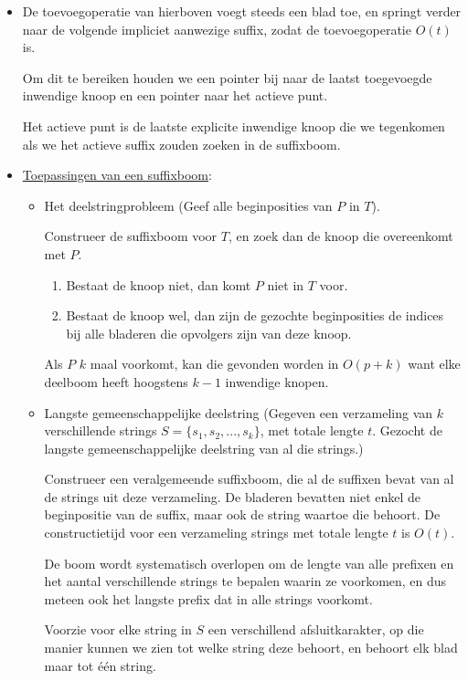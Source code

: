 \documentclass{report}
\begin{document}
\begin{itemize}
	\item[\info] De toevoegoperatie van hierboven voegt steeds een blad toe, en springt verder naar de volgende impliciet aanwezige suffix, zodat de toevoegoperatie $O(t)$ is. 

	Om dit te bereiken houden we een pointer bij naar de laatst toegevoegde inwendige knoop en een pointer naar het actieve punt.
	
	Het actieve punt is de laatste explicite inwendige knoop die we tegenkomen als we het actieve suffix zouden zoeken in de suffixboom.


	\item[\info] \underline{Toepassingen van een suffixboom}:
	\begin{itemize}
		\item[\info] Het deelstringprobleem (Geef alle beginposities van $P$ in $T$). 

		Construeer de suffixboom voor $T$, en zoek dan de knoop die overeenkomt met $P$.
		\begin{enumerate}
			\item Bestaat de knoop niet, dan komt $P$ niet in $T$ voor. 
			\item Bestaat de knoop wel, dan zijn de gezochte beginposities de indices bij alle bladeren die opvolgers zijn van deze knoop. 
		\end{enumerate}

		Als $P$ $k$ maal voorkomt, kan die gevonden worden in $O(p + k)$ want elke deelboom heeft hoogstens $k - 1$ inwendige knopen.
		\item[\info] Langste gemeenschappelijke deelstring (Gegeven een verzameling van $k$ verschillende strings $S = \{s_1, s_2, ..., s_k\}$, met totale lengte $t$. Gezocht de langste gemeenschappelijke deelstring van al die strings.)

		Construeer een veralgemeende suffixboom, die al de suffixen bevat van al de strings uit deze verzameling. De bladeren bevatten niet enkel de beginpositie van de suffix, maar ook de string waartoe die behoort. De constructietijd voor een verzameling strings met totale lengte $t$ is $O(t)$.

		De boom wordt systematisch overlopen om de lengte van alle prefixen en het aantal verschillende strings te bepalen waarin ze voorkomen, en dus meteen ook het langste prefix dat in alle strings voorkomt. 

		Voorzie voor elke string in $S$ een verschillend afsluitkarakter, op die manier kunnen we zien tot welke string deze behoort, en behoort elk blad maar tot één string.


	\end{itemize}
	

\end{itemize}
\end{document}
